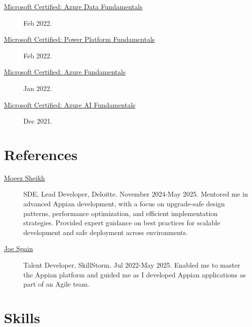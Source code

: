 \documentclass{article}
\begin{document}
\begin{description}
  \item [\href{https://learn.microsoft.com/api/credentials/share/en-us/AlexKoikCestone-7541/37294D69297F1741?sharingId=DCF7D068E6ED12E6}{Microsoft Certified: Azure Data Fundamentals}] Feb 2022.
  \item [\href{https://learn.microsoft.com/api/credentials/share/en-us/AlexKoikCestone-7541/CE492D7BE04E2F0D?sharingId=DCF7D068E6ED12E6}{Microsoft Certified: Power Platform Fundamentals}] Feb 2022.
  \item [\href{https://learn.microsoft.com/api/credentials/share/en-us/AlexKoikCestone-7541/51E3A61AEA2E3998?sharingId=DCF7D068E6ED12E6}{Microsoft Certified: Azure Fundamentals}] Jan 2022.
  \item [\href{https://learn.microsoft.com/api/credentials/share/en-us/AlexKoikCestone-7541/32EE850D92B0C609?sharingId=DCF7D068E6ED12E6}{Microsoft Certified: Azure AI Fundamentals}] Dec 2021.
\end{description}

\vspace{-1em}
\section*{References}\vspace{-0.5em}
\begin{description}
  \item [\href{https://www.linkedin.com/in/moeezsheikh/}{Moeez Sheikh}] SDE, Lead Developer, Deloitte. November 2024-May 2025. Mentored me in advanced Appian development, with a focus on upgrade-safe design patterns, performance optimization, and efficient implementation strategies. Provided expert guidance on best practices for scalable development and safe deployment across environments. 
  \item [\href{https://www.linkedin.com/in/joespain/}{Joe Spain}] Talent Developer, SkillStorm. Jul 2022-May 2025. Enabled me to master the Appian platform and guided me as I developed Appian applications as part of an Agile team.
\end{description}

\vspace{-1em}
\section*{Skills}\vspace{-0.5em}
\end{document}
